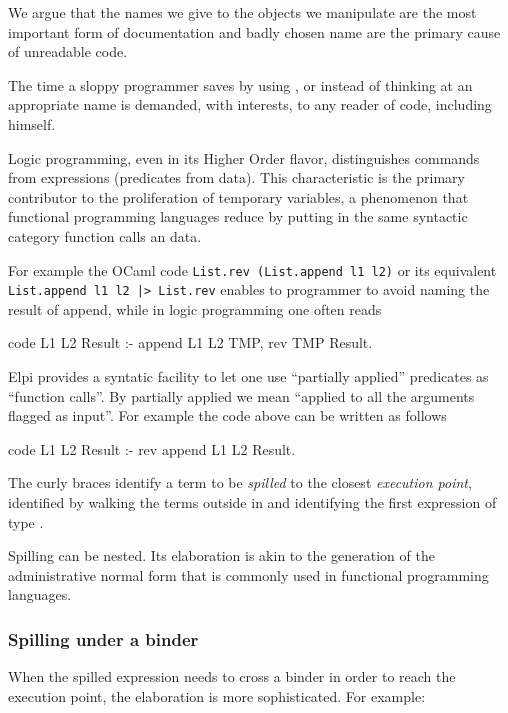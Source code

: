 \documentclass[a4paper, 11pt]{book}
\begin{document}
We argue that the names we give to the objects we manipulate
are the most important form of documentation and badly chosen
name are the primary cause of unreadable code.

The time a sloppy programmer saves by using , 
or  instead of thinking at an appropriate name is
demanded, with interests, to any reader of code, including himself.

Logic programming, even in its Higher Order flavor, distinguishes
commands from expressions (predicates from data). This characteristic
is the primary contributor to the proliferation of temporary
variables, a phenomenon that functional programming languages
reduce by putting in the same syntactic category function calls an
data. 

For example the OCaml code \texttt{List.rev (List.append l1 l2)}
or its equivalent \texttt{List.append l1 l2 |> List.rev} enables
to programmer to avoid naming the result of append, while in logic
programming one often reads

\begin{elpicode}
code L1 L2 Result :- append L1 L2 TMP, rev TMP Result.
\end{elpicode}

Elpi provides a syntatic facility to let one use
``partially applied'' predicates as ``function calls''.
By partially applied we mean ``applied to all the arguments flagged as input''.
For example the code above can be written as follows

\begin{elpicode}
code L1 L2 Result :- rev {append L1 L2} Result.
\end{elpicode}

The curly braces identify a term to be \emph{spilled} to the closest
\emph{execution point}, identified by walking the terms outside in and
identifying the first expression of type .

Spilling can be nested. Its elaboration is akin to the generation
of the administrative normal form that is commonly used in functional
programming languages.

\subsubsection{Spilling under a binder}

When the spilled expression needs to cross a binder in order to
reach the execution point, the elaboration is more sophisticated.
For example: 
\end{document}
